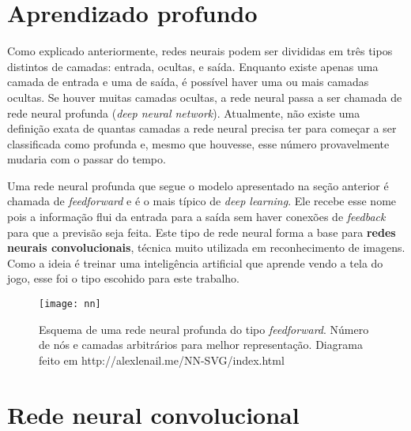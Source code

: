 \section{Aprendizado profundo}
\label{sec:dl}

Como explicado anteriormente, redes neurais podem ser divididas em três tipos distintos de camadas: entrada, ocultas, e saída. Enquanto existe apenas uma camada de entrada e uma de saída, é possível haver uma ou mais camadas ocultas. Se houver muitas camadas ocultas, a rede neural passa a ser chamada de rede neural profunda (\textit{deep neural network}). Atualmente, não existe uma definição exata de quantas camadas a rede neural precisa ter para começar a ser classificada como profunda e, mesmo que houvesse, esse número provavelmente mudaria com o passar do tempo.

Uma rede neural profunda que segue o modelo apresentado na seção anterior é chamada de \textit{feedforward} e é o mais típico de \textit{deep learning}. Ele recebe esse nome pois a informação flui da entrada para a saída sem haver conexões de \textit{feedback} para que a previsão seja feita. Este tipo de rede neural forma a base para \textbf{redes neurais convolucionais}, técnica muito utilizada em reconhecimento de imagens. Como a ideia é treinar uma inteligência artificial que aprende vendo a tela do jogo, esse foi o tipo escohido para este trabalho.

\begin{figure}[h!]
\texttt{[image: nn]}
\centering
\caption{Esquema de uma rede neural profunda do tipo \textit{feedforward}. Número de nós e camadas arbitrários para melhor representação. Diagrama feito em http://alexlenail.me/NN-SVG/index.html}
\end{figure}


\section{Rede neural convolucional}
\label{sec:cnn}

